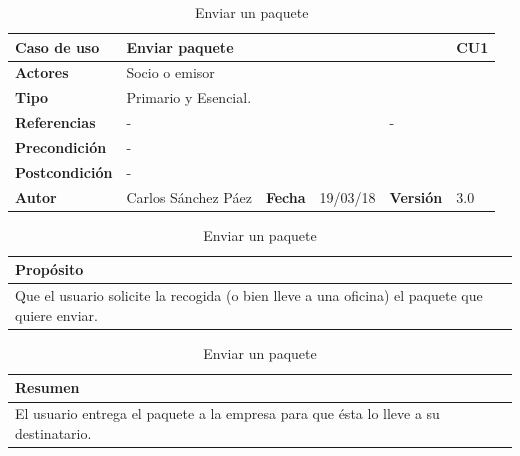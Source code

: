 \documentclass[12pt,spanish]{article}
\begin{document}
\begin{table}[H]
\centering
\begin{tabular}{|m{3cm}|m{4cm}|m{2cm}|m{2cm}|m{2cm}|m{1cm}|}
\hline
\textbf{Caso de uso} &  \multicolumn{4}{m{8cm}|}{Enviar paquete} \vline &  \cellcolor{gray!40}CU1 \\
\hline
\textbf{Actores} & \multicolumn{5}{m{8cm}|}{Socio o emisor} \\
\hline
\textbf{Tipo} & \multicolumn{5}{m{8cm}|}{Primario y Esencial.} \\
\hline
\textbf{Referencias} &\multicolumn{3}{m{4cm}|}{-} & \multicolumn{2}{m{4cm}|}{-} \\
\hline
\textbf{Precondición} & \multicolumn{5}{m{8cm}|}{-} \\
\hline
\textbf{Postcondición} & \multicolumn{5}{m{8cm}|}{-} \\
\hline
\textbf{Autor} & Carlos Sánchez Páez & \textbf{Fecha} & 19/03/18 & \textbf{Versión} & 3.0 \\
\hline
\end{tabular}

\vspace{1cm}

\begin{tabular}{|m{16.2cm}|}
\hline
\textbf{Propósito} \\
\hline
Que el usuario solicite la recogida (o bien lleve a una oficina) el paquete que quiere enviar. \\
\hline
\end{tabular}

\vspace{1cm}

\begin{tabular}{|m{16.2cm}|}
\hline
\textbf{Resumen} \\
\hline
El usuario entrega el paquete a la empresa para que ésta lo lleve a su destinatario. \\
\hline
\end{tabular}

\caption{Enviar un paquete}
\label{cu:1}
\end{table}

\end{document}
